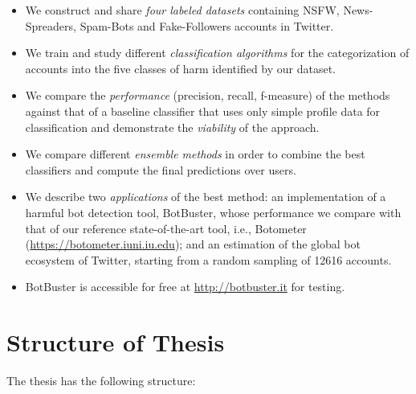 \begin{itemize}
	\item[\PencilRight] We construct and share \emph{four labeled datasets} containing NSFW, News-Spreaders, Spam-Bots and Fake-Followers accounts in Twitter.
	
	\item[\PencilRight] We train and study different \emph{classification algorithms}	for the categorization of accounts into the five classes of harm identified by our dataset.
	
	\item[\PencilRight] We compare the \emph{performance} (precision, recall, f-measure) of the methods against that of a baseline classifier that uses only simple profile data for classification and demonstrate the \emph{viability} of the approach.
	
	\item[\PencilRight] We compare different \emph{ensemble methods} in order to combine the best classifiers and compute  the final predictions over users.
	
	\item[\PencilRight] We describe two \emph{applications} of the best method: an implementation of a harmful bot detection tool, BotBuster, whose performance we compare with that of our reference state-of-the-art tool, i.e., Botometer (\url{https://botometer.iuni.iu.edu}); and an estimation of the global bot ecosystem of Twitter, starting from a random sampling of 12616 accounts.
	
	\item[\PencilRight] BotBuster is accessible for free at \url{http://botbuster.it} for testing.
\end{itemize}


\section{Structure of Thesis}

The thesis has the following structure:

